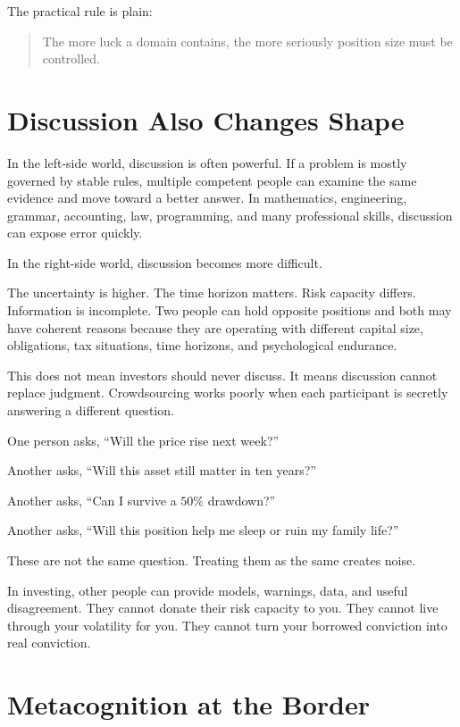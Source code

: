 The practical rule is plain:

\begin{quote}
The more luck a domain contains, the more seriously position size must be controlled.
\end{quote}

\section*{Discussion Also Changes Shape}

In the left-side world, discussion is often powerful. If a problem is mostly governed by stable rules, multiple competent people can examine the same evidence and move toward a better answer. In mathematics, engineering, grammar, accounting, law, programming, and many professional skills, discussion can expose error quickly.

In the right-side world, discussion becomes more difficult.

The uncertainty is higher. The time horizon matters. Risk capacity differs. Information is incomplete. Two people can hold opposite positions and both may have coherent reasons because they are operating with different capital size, obligations, tax situations, time horizons, and psychological endurance.

This does not mean investors should never discuss. It means discussion cannot replace judgment. Crowdsourcing works poorly when each participant is secretly answering a different question.

One person asks, ``Will the price rise next week?''

Another asks, ``Will this asset still matter in ten years?''

Another asks, ``Can I survive a \(50\%\) drawdown?''

Another asks, ``Will this position help me sleep or ruin my family life?''

These are not the same question. Treating them as the same creates noise.

In investing, other people can provide models, warnings, data, and useful disagreement. They cannot donate their risk capacity to you. They cannot live through your volatility for you. They cannot turn your borrowed conviction into real conviction.

\section*{Metacognition at the Border}

